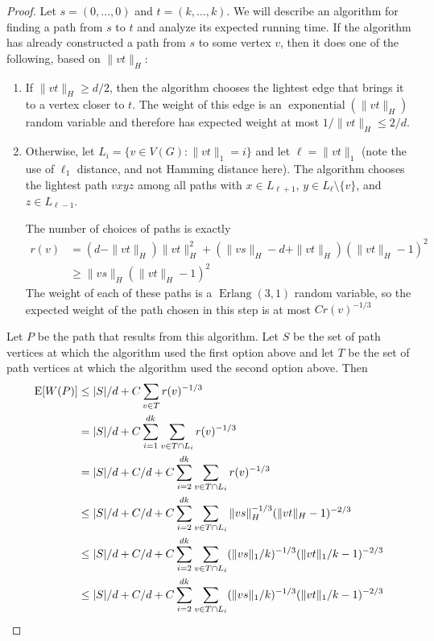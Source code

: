 \documentclass[lotsofwhite]{patmorin}
\DeclareMathOperator{\exponential}{exponential}
\DeclareMathOperator{\erlang}{Erlang}
\begin{document}
\begin{proof}
Let $s=(0,\ldots,0)$ and $t=(k,\ldots,k)$. We will describe an algorithm
for finding a path from $s$ to $t$ and analyze its expected running time.
If the algorithm has already constructed a path from $s$ to some vertex $v$,
then it does one of the following, based on $\|vt\|_H$:
\begin{enumerate}

  \item If $\|vt\|_H \ge d/2$, then the algorithm chooses the lightest 
    edge that brings it to a vertex closer to $t$.  The weight of this
    edge is an $\exponential(\|vt\|_H)$ random variable and therefore has
    expected weight at most $1/\|vt\|_H \le 2/d$.

  \item Otherwise, let $L_i = \{v\in V(G): \|vt\|_1=i\}$ and let
    $\ell=\|vt\|_1$ (note the use of $\ell_1$ distance, and not Hamming
    distance here).  The algorithm chooses the lightest path $vxyz$ among
    all paths with $x\in L_{\ell+1}$,  $y\in L_{\ell}\setminus\{v\}$,
    and $z\in L_{\ell-1}$.

    The number of choices of paths is exactly
    \begin{align*}
        r(v) & = (d-\|vt\|_H)\|vt\|_H^2 
               + (\|vs\|_H-d+\|vt\|_H)(\|vt\|_H-1)^2 \\
             & \ge \|vs\|_H(\|vt\|_H-1)^2
    \end{align*}
    The weight of each of these paths is a
    $\erlang(3,1)$ random variable, so the expected weight of the path
    chosen in this step is at most $Cr(v)^{-1/3}$
\end{enumerate}
Let $P$ be the path that results from this algorithm.  Let $S$ be the
set of path vertices at which the algorithm used the first option above
and let $T$ be the set of path vertices at which the algorithm used the
second option above.  Then
\begin{align*}
    \mathrm{E}[W(P)] & \le |S|/d + C\sum_{v\in T}r(v)^{-1/3} \\
             & = |S|/d + C\sum_{i=1}^{dk}\sum_{v\in T\cap L_i}r(v)^{-1/3} \\
             & = |S|/d + C/d + C\sum_{i=2}^{dk}\sum_{v\in T\cap L_i}r(v)^{-1/3} \\
             & \le |S|/d + C/d + C\sum_{i=2}^{dk}\sum_{v\in T\cap L_i}\|vs\|_H^{-1/3}(\|vt\|_H-1)^{-2/3} \\
             & \le |S|/d + C/d + C\sum_{i=2}^{dk}\sum_{v\in T\cap L_i}(\|vs\|_1/k)^{-1/3}(\|vt\|_1/k-1)^{-2/3} \\
             & \le |S|/d + C/d + C\sum_{i=2}^{dk}\sum_{v\in T\cap L_i}(\|vs\|_1/k)^{-1/3}(\|vt\|_1/k-1)^{-2/3} \\
\end{align*}



\end{proof}
\end{document}
